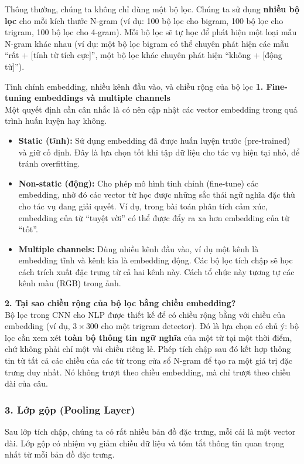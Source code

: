 Thông thường, chúng ta không chỉ dùng một bộ lọc. Chúng ta sử dụng \textbf{nhiều bộ lọc} cho mỗi kích thước N-gram (ví dụ: 100 bộ lọc cho bigram, 100 bộ lọc cho trigram, 100 bộ lọc cho 4-gram). Mỗi bộ lọc sẽ tự học để phát hiện một loại mẫu N-gram khác nhau (ví dụ: một bộ lọc bigram có thể chuyên phát hiện các mẫu “rất + [tính từ tích cực]”, một bộ lọc khác chuyên phát hiện “không + [động từ]”).
\begin{deepdive}{Tinh chỉnh embedding, nhiều kênh đầu vào, và chiều rộng của bộ lọc}
\textbf{1. Fine-tuning embeddings và multiple channels} \\
Một quyết định cần cân nhắc là có nên cập nhật các vector embedding trong quá trình huấn luyện hay không.
\begin{itemize}
    \item \textbf{Static (tĩnh):} Sử dụng embedding đã được huấn luyện trước (pre-trained) và giữ cố định. Đây là lựa chọn tốt khi tập dữ liệu cho tác vụ hiện tại nhỏ, để tránh overfitting.
    \item \textbf{Non-static (động):} Cho phép mô hình tinh chỉnh (fine-tune) các embedding, nhờ đó các vector từ học được những sắc thái ngữ nghĩa đặc thù cho tác vụ đang giải quyết. Ví dụ, trong bài toán phân tích cảm xúc, embedding của từ “tuyệt vời” có thể được đẩy ra xa hơn embedding của từ “tốt”.
    \item \textbf{Multiple channels:} Dùng nhiều kênh đầu vào, ví dụ một kênh là embedding tĩnh và kênh kia là embedding động. Các bộ lọc tích chập sẽ học cách trích xuất đặc trưng từ cả hai kênh này. Cách tổ chức này tương tự các kênh màu (RGB) trong ảnh.
\end{itemize}

\textbf{2. Tại sao chiều rộng của bộ lọc bằng chiều embedding?} \\
Bộ lọc trong CNN cho NLP được thiết kế để có chiều rộng bằng với chiều của embedding (ví dụ, $3 \times 300$ cho một trigram detector). Đó là lựa chọn có chủ ý: bộ lọc cần xem xét \textbf{toàn bộ thông tin ngữ nghĩa} của một từ tại một thời điểm, chứ không phải chỉ một vài chiều riêng lẻ. Phép tích chập sau đó kết hợp thông tin từ tất cả các chiều của các từ trong cửa sổ N-gram để tạo ra một giá trị đặc trưng duy nhất. Nó không trượt theo chiều embedding, mà chỉ trượt theo chiều dài của câu.
\end{deepdive}
\subsubsection{3. Lớp gộp (Pooling Layer)}
Sau lớp tích chập, chúng ta có rất nhiều bản đồ đặc trưng, mỗi cái là một vector dài. Lớp gộp có nhiệm vụ giảm chiều dữ liệu và tóm tắt thông tin quan trọng nhất từ mỗi bản đồ đặc trưng.

